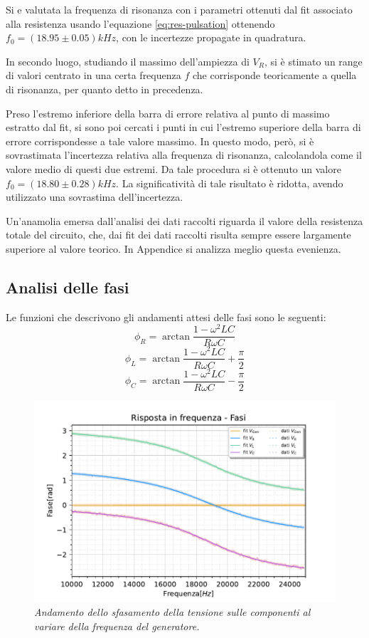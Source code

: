 Si e valutata la frequenza di risonanza con i parametri ottenuti dal fit associato alla resistenza usando l'equazione
\ref{eq:res-pulsation} ottenendo $f_0 = (18.95 \pm 0.05) kHz$, con le incertezze propagate in quadratura.

In secondo luogo, studiando il massimo dell'ampiezza di $V_R$, si è stimato un range di valori centrato in
una certa frequenza $f$ che corrisponde teoricamente a quella di risonanza, per quanto detto in precedenza.


Preso l’estremo inferiore della barra di errore relativa al punto di massimo estratto dal fit, si sono poi cercati i
punti in cui l’estremo superiore della barra di errore corrispondesse a tale valore massimo. In questo modo, però, si
è sovrastimata l’incertezza relativa alla frequenza di risonanza, calcolandola come il valore medio di questi due estremi.
Da tale procedura si è ottenuto un valore $f_0 = (18.80 \pm 0.28)kHz$.
La significatività di tale risultato è ridotta, avendo utilizzato una sovrastima dell'incertezza.

Un'anamolia emersa dall'analisi dei dati raccolti riguarda il valore della resistenza totale del circuito, che, dai fit
dei dati raccolti risulta sempre essere largamente superiore al valore teorico. In Appendice si analizza meglio questa
evenienza.

\subsection{Analisi delle fasi}

Le funzioni che descrivono gli andamenti attesi delle fasi sono le seguenti:
 \[
     \phi_R = \arctan{\frac{1 - \omega^2 L C}{R \omega C}}
 \]
\[
    \phi_L = \arctan{\frac{1 - \omega^2 L C}{R \omega C}} + \frac{\pi}{2}
\]
 \[
     \phi_C = \arctan{\frac{1 - \omega^2 L C}{R \omega C}} - \frac{\pi}{2}
 \]

\begin{figure}[h]
    \centering
    \includegraphics[width=.8\textwidth]{../figs/Risposta-in-frequenza-fasi.pdf}
    \caption{\emph{Andamento dello sfasamento della tensione sulle componenti al variare della frequenza del generatore.}}
    \label{fig:fasi}
\end{figure}

